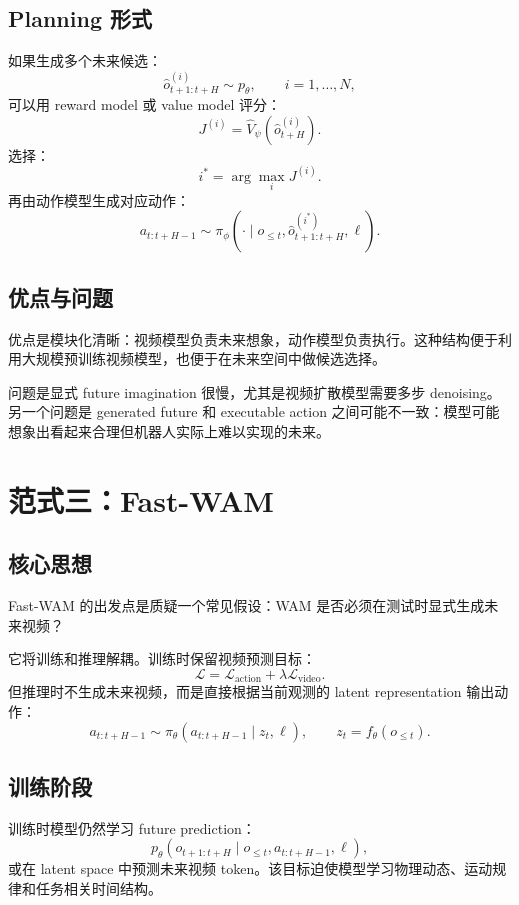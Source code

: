\documentclass[11pt,a4paper]{ctexart}
\begin{document}
\subsection{Planning 形式}

如果生成多个未来候选：
\[
  \hat{o}^{(i)}_{t+1:t+H}\sim p_\theta,
  \qquad i=1,\ldots,N,
\]
可以用 reward model 或 value model 评分：
\[
  J^{(i)}=\hat{V}_\psi(\hat{o}^{(i)}_{t+H}).
\]
选择：
\[
  i^*=\arg\max_i J^{(i)}.
\]
再由动作模型生成对应动作：
\[
  a_{t:t+H-1}
  \sim
  \pi_\phi(\cdot\mid o_{\le t},\hat{o}^{(i^*)}_{t+1:t+H},\ell).
\]

\subsection{优点与问题}

优点是模块化清晰：视频模型负责未来想象，动作模型负责执行。这种结构便于利用大规模预训练视频模型，也便于在未来空间中做候选选择。

问题是显式 future imagination 很慢，尤其是视频扩散模型需要多步 denoising。另一个问题是 generated future 和 executable action 之间可能不一致：模型可能想象出看起来合理但机器人实际上难以实现的未来。

\section{范式三：Fast-WAM}

\subsection{核心思想}

Fast-WAM 的出发点是质疑一个常见假设：WAM 是否必须在测试时显式生成未来视频？

它将训练和推理解耦。训练时保留视频预测目标：
\[
  \mathcal{L}
  =
  \mathcal{L}_{\mathrm{action}}
  +
  \lambda\mathcal{L}_{\mathrm{video}}.
\]
但推理时不生成未来视频，而是直接根据当前观测的 latent representation 输出动作：
\[
  a_{t:t+H-1}
  \sim
  \pi_\theta(a_{t:t+H-1}\mid z_t,\ell),
  \qquad
  z_t=f_\theta(o_{\le t}).
\]

\subsection{训练阶段}

训练时模型仍然学习 future prediction：
\[
  p_\theta(o_{t+1:t+H}\mid o_{\le t},a_{t:t+H-1},\ell),
\]
或在 latent space 中预测未来视频 token。该目标迫使模型学习物理动态、运动规律和任务相关时间结构。
\end{document}
